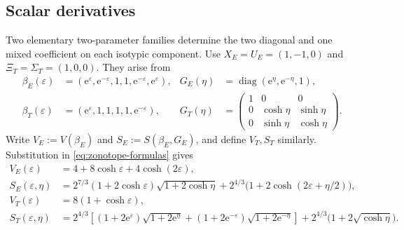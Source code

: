 \documentclass[11pt]{article}
\newcommand{\e}{\mathrm e}
\theoremstyle{remark}
\begin{document}
\subsection{Scalar derivatives}
Two elementary two-parameter families determine the two diagonal and one mixed
coefficient on each isotypic component.
%
Use $X_E=U_E=(1,-1,0)$ and $\Xi_T=\Sigma_T=(1,0,0)$.  They arise from
\begin{equation}\label{eq:representative-paths}
\begin{aligned}
 \beta_E(\varepsilon)&=(\e^\varepsilon,\e^{-\varepsilon},1,1,
                          \e^{-\varepsilon},\e^\varepsilon),&
 G_E(\eta)&=\operatorname{diag}(\e^\eta,\e^{-\eta},1),\\
 \beta_T(\varepsilon)&=(\e^\varepsilon,1,1,1,1,\e^{-\varepsilon}),&
 G_T(\eta)&=\begin{pmatrix}1&0&0\\0&\cosh\eta&\sinh\eta\\
                            0&\sinh\eta&\cosh\eta\end{pmatrix}.
\end{aligned}
\end{equation}
Write $V_E:=V(\beta_E)$ and $S_E:=S(\beta_E,G_E)$, and define $V_T,S_T$
similarly.  Substitution in \eqref{eq:zonotope-formulas} gives
\begin{equation}\label{eq:restricted-formulas}
\begin{aligned}
 V_E(\varepsilon)&=4+8\cosh\varepsilon+4\cosh(2\varepsilon),\\
 S_E(\varepsilon,\eta)
 &=2^{7/3}(1+2\cosh\varepsilon)
      \sqrt{1+2\cosh\eta}
   +2^{4/3}\bigl(1+2\cosh(2\varepsilon+\eta/2)\bigr),\\
 V_T(\varepsilon)&=8(1+\cosh\varepsilon),\\
 S_T(\varepsilon,\eta)
 &=2^{4/3}\left[
 (1+2\e^\varepsilon)\sqrt{1+2\e^\eta}
 +(1+2\e^{-\varepsilon})\sqrt{1+2\e^{-\eta}}\right]
 +2^{4/3}\bigl(1+2\sqrt{\cosh\eta}\bigr).
\end{aligned}
\end{equation}
\end{document}

